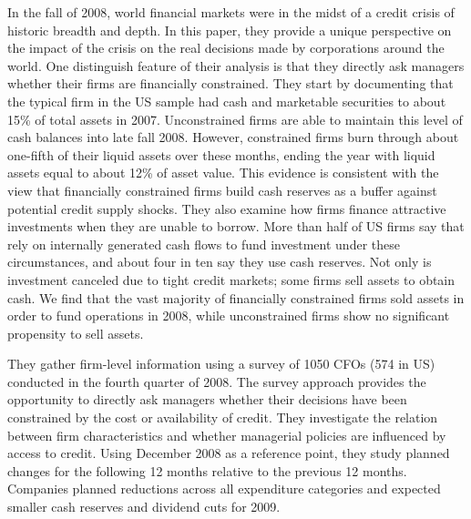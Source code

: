 \documentclass{article}
\begin{document}
{In the fall of 2008, world financial markets were in the midst of a credit crisis of historic breadth and depth. In this paper, they provide a unique perspective on the impact of the crisis on the real decisions made by corporations around the world. One distinguish feature of their analysis is that they directly ask managers whether their firms are financially constrained. They start by documenting that the typical firm in the US sample had cash and marketable securities to about 15\% of total assets in 2007. Unconstrained firms are able to maintain this level of cash balances into late fall 2008. However, constrained firms burn through about one-fifth of their liquid assets over these months, ending the year with liquid assets equal to about 12\% of asset value. This evidence is consistent with the view that financially constrained firms build cash reserves as a buffer against potential credit supply shocks. They also examine how firms finance attractive investments when they are unable to borrow. More than half of US firms say that rely on internally generated cash flows to fund investment under these circumstances, and about four in ten say they use cash reserves. Not only is investment canceled due to tight credit markets; some firms sell assets to obtain cash. We find that the vast majority of financially constrained firms sold assets in order to fund operations in 2008, while unconstrained firms show no significant propensity  to sell assets. 

They gather firm-level information using a survey of 1050 CFOs (574 in US) conducted in the fourth quarter of 2008. The survey approach provides the opportunity to directly ask managers whether their decisions have been constrained by the cost or availability of credit. They investigate the relation between firm characteristics and whether managerial policies are influenced by access to credit. Using December 2008 as a reference point, they study planned changes for the following 12 months relative to the previous 12 months. Companies planned reductions across all expenditure categories and expected smaller cash reserves and dividend cuts for 2009. 

}
\end{document}

